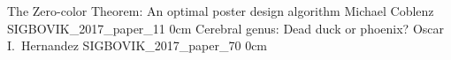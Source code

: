 \addpaper
	{The Zero-color Theorem: An optimal poster design algorithm}
	{Michael Coblenz}
	{}
	{SIGBOVIK_2017_paper_11}
	{0cm}
	{}
\addpaper
	{Cerebral genus: Dead duck or phoenix?}
	{Oscar I.\ Hernandez}
	{}
	{SIGBOVIK_2017_paper_70}
	{0cm}
	{}

